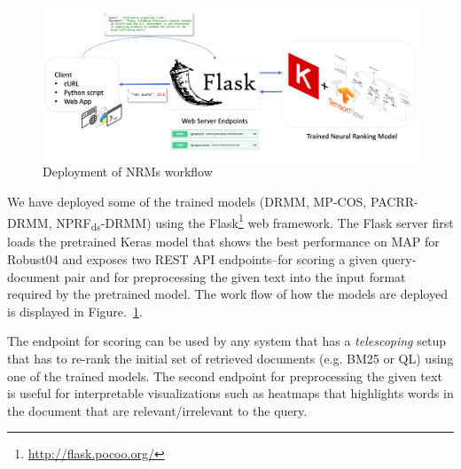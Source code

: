 \begin{figure}[h]
    \centering
    \includegraphics[width=\textwidth]{Figures/trained_model_deploy2.png}
    \caption{Deployment of NRMs workflow}
    \label{fig:nrm_deployment}
\end{figure}
We have deployed some of the trained models (DRMM, MP-COS, PACRR-DRMM, NPRF\textsubscript{ds}-DRMM) using the Flask\footnote{\url{http://flask.pocoo.org/}} web framework. The Flask server first loads the pretrained Keras model that shows the best performance on MAP for Robust04 and exposes two REST API endpoints--for scoring a given query-document pair and for preprocessing the given text into the input format required by the pretrained model. The work flow of how the models are deployed is displayed in Figure.~\ref{fig:nrm_deployment}.

The endpoint for scoring can be used by any system that has a \textit{telescoping} setup that has to re-rank the initial set of retrieved documents (e.g. BM25 or QL) using one of the trained models. The second endpoint for preprocessing the given text is useful for interpretable visualizations such as heatmaps that highlights words in the document that are relevant/irrelevant to the query.

